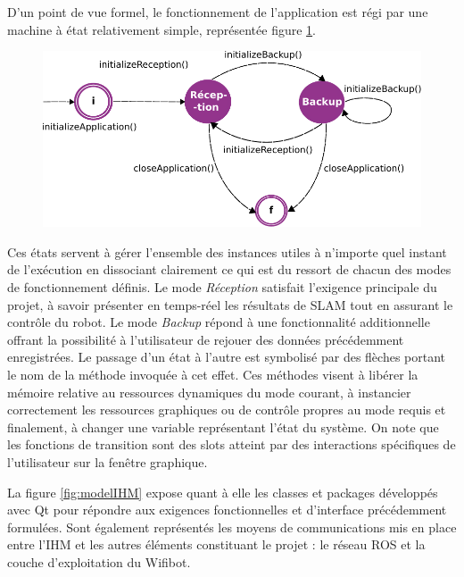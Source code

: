 D'un point de vue formel, le fonctionnement de l'application est régi par une machine à état relativement simple, représentée figure \ref{fig:stateMachine}.

\begin{figure}[h]
  \centering
    \includegraphics[width=.7\linewidth]{figures/state_machine}  
  \label{fig:stateMachine}
\end{figure}

Ces états servent à gérer l'ensemble des instances utiles à n'importe quel instant de l'exécution en dissociant clairement ce qui est du ressort de chacun des modes de fonctionnement définis. 
Le mode \emph{Réception} satisfait l'exigence principale du projet, à savoir présenter en temps-réel les résultats de \gls{SLAM} tout en assurant le contrôle du robot. 
Le mode \emph{Backup} répond à une fonctionnalité additionnelle offrant la possibilité à l'utilisateur de rejouer des données précédemment enregistrées. 
Le passage d'un état à l'autre est symbolisé par des flèches portant le nom de la méthode invoquée à cet effet.
Ces méthodes visent à libérer la mémoire relative au ressources dynamiques du mode courant, à instancier correctement les ressources graphiques ou de contrôle propres au mode requis et finalement, à changer une variable représentant 
l'état du système. 
On note que les fonctions de transition sont des slots atteint par des interactions spécifiques de l'utilisateur sur la fenêtre graphique. 

La figure \ref{fig:modelIHM} expose quant à elle les classes et packages développés avec Qt pour répondre aux exigences fonctionnelles et d'interface précédemment formulées.   
Sont également représentés les moyens de communications mis en place entre l'IHM et les autres éléments constituant le projet : le réseau \gls{ROS} et la couche d'exploitation du Wifibot. 

